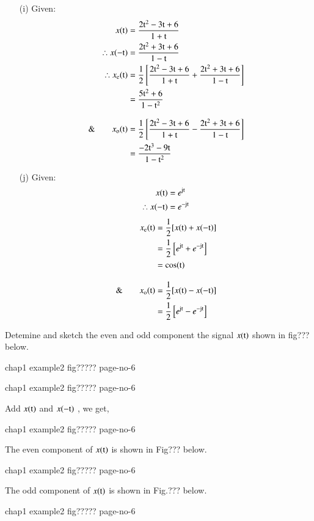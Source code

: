 \begin{solution}
\begin{itemize}
\item[{\rm(i)}] Given:
\begin{align*}
x(\textrm{t}) &= \dfrac{2\textrm{t}^{2}-3\textrm{t}+6}{1+ \textrm{t}}\\
\therefore x(-\textrm{t}) &= \dfrac{2\textrm{t}^{2}+ 3\textrm{t} + 6}{1-\textrm{t}}\\
\therefore x_{\textrm{e}}(\textrm{t}) &= \dfrac{1}{2}\left[\dfrac{2\textrm{t}^{2}-3\textrm{t}+6}{1+ \textrm{t}}+ \dfrac{2\textrm{t}^{2}+ 3\textrm{t}+6}{1-\textrm{t}}\right]\\
&= \dfrac{5\textrm{t}^{2}+6}{1-\textrm{t}^{2}}\\[0.3cm]
\&\qquad x_{\textrm{o}}(\textrm{t}) &= \dfrac{1}{2}\left[\dfrac{2\textrm{t}^{2}-3\textrm{t}+6}{1+ \textrm{t}} -\dfrac{2\textrm{t}^{2}+ 3\textrm{t} + 6}{1-\textrm{t}}\right]\\
&=\dfrac{-2\textrm{t}^{3}-9\textrm{t}}{1-\textrm{t}^{2}}
\end{align*}

\item[{\rm (j)}]Given:
\begin{align*}
x(\textrm{t}) &= e^{\textrm{j} \textrm{t}}\\
\therefore x(-\textrm{t}) &= e^{-\textrm{j} \textrm{t}}
\end{align*}
\begin{align*}
x_{\textrm{e}}(\textrm{t}) &= \dfrac{1}{2}[x(\textrm{t})+ x(-\textrm{t})]\\
&=\dfrac{1}{2}\left[e^{\textrm{j}\textrm{t}} + e^{-\textrm{j}\textrm{t}}\right]\\
&=\cos(\textrm{t})\\[0.3cm]
\& \qquad x_{\textrm{o}}(\textrm{t}) &= \dfrac{1}{2}[x(\textrm{t})-x(-\textrm{t})]\\
                         &=\dfrac{1}{2}\left[e^{\textrm{j}\textrm{t}}-e^{-\textrm{j}\textrm{t}}\right]  
\end{align*}
\end{itemize}
\end{solution}

\begin{exam*}
Detemine and sketch the even and odd component the signal $x(\textrm{t})$ shown in fig??? below.
\begin{center}
chap1 example2  fig????? page-no-6 
\end{center}
\end{exam*}
\begin{solution}
\begin{center}
chap1 example2  fig????? page-no-6 
\end{center}

Add $x(\textrm{t})$ and $x(-\textrm{t})$ , we get, 
\begin{center}
chap1 example2  fig????? page-no-6 
\end{center}

The even component of $x(\textrm{t})$ is shown in Fig??? below.
\begin{center}
chap1 example2  fig????? page-no-6 
\end{center}

The odd component of $x(\textrm{t})$ is shown in Fig.??? below.
\begin{center}
chap1 example2  fig????? page-no-6 
\end{center}
\end{solution}

